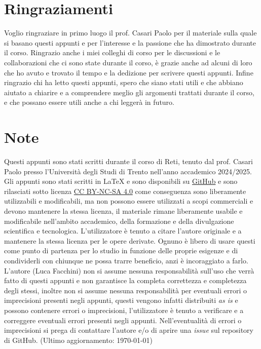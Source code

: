 \section*{Ringraziamenti}
Voglio ringraziare in primo luogo il prof. Casari Paolo per il materiale sulla quale si basano questi appunti e per l'interesse e la passione che ha dimostrato durante il corso.\newline
Ringrazio anche i miei colleghi di corso per le discussioni e le collaborazioni che ci sono state durante il corso, è grazie anche ad alcuni di loro che ho avuto e trovato il tempo e la dedizione per scrivere questi appunti.\newline
Infine ringrazio chi ha letto questi appunti, spero che siano stati utili e che abbiano aiutato a chiarire e a comprendere meglio gli argomenti trattati durante il corso, e che possano essere utili anche a chi leggerà in futuro.
\vfill
\footnotesize\section*{Note}
Questi appunti sono stati scritti durante il corso di Reti, tenuto dal prof. Casari Paolo presso l'Università degli Studi di Trento nell'anno accademico 2024/2025. Gli appunti sono stati scritti in \LaTeX{} e sono disponibili su \href{https://github.com/lucafano04/appuntisecondoanno}{GitHub} e sono rilasciati sotto licenza \href{https://creativecommons.org/licenses/by-nc-sa/4.0/}{CC BY-NC-SA 4.0} come conseguenza sono liberamente utilizzabili e modificabili, ma non possono essere utilizzati a scopi commerciali e devono mantenere la stessa licenza, il materiale rimane liberamente usabile e modificabile nell'ambito accademico, della formazione e della divulgazione scientifica e tecnologica. L'utilizzatore è tenuto a citare l'autore originale e a mantenere la stessa licenza per le opere derivate. Ognuno è libero di usare questi come punto di partenza per lo studio in funzione delle proprie esigenze e di condividerli con chiunque ne possa trarre beneficio, anzi è incoraggiato a farlo.
L'autore (Luca Facchini) non si assume nessuna responsabilità sull'uso che verrà fatto di questi appunti e non garantisce la completa correttezza e completezza degli stessi, inoltre non si assume nessuna responsabilità per eventuali errori o imprecisioni presenti negli appunti, questi vengono infatti distribuiti \textit{as is} e possono contenere errori o imprecisioni, l'utilizzatore è tenuto a verificare e a correggere eventuali errori presenti negli appunti. Nell'eventualità di errori o imprecisioni si prega di contattare l'autore e/o di aprire una \textit{issue} sul repository di GitHub. (Ultimo aggiornamento: \today)